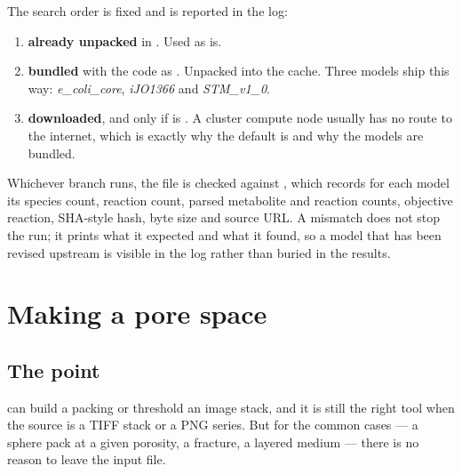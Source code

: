 The search order is fixed and is reported in the log:

\begin{enumerate}[leftmargin=1.6em]
\item \textbf{already unpacked} in . Used as is.
\item \textbf{bundled} with the code as . Unpacked
      into the cache. Three models ship this way: \emph{e\_coli\_core},
      \emph{iJO1366} and \emph{STM\_v1\_0}.
\item \textbf{downloaded}, and only if  is .
      A cluster compute node usually has no route to the internet, which is
      exactly why the default is  and why the models are bundled.
\end{enumerate}

Whichever branch runs, the file is checked against ,
which records for each model its species count, reaction count, parsed
metabolite and reaction counts, objective reaction, SHA-style hash, byte size
and source URL. A mismatch does not stop the run; it prints what it expected
and what it found, so a model that has been revised upstream is visible in the
log rather than buried in the results.



\chapter{Making a pore space}
\label{ch:geomgen}

\section{The point}

 can build a packing or threshold an image stack, and
it is still the right tool when the source is a TIFF stack or a PNG series.
But for the common cases --- a sphere pack at a given porosity, a fracture, a
layered medium --- there is no reason to leave the input file.

